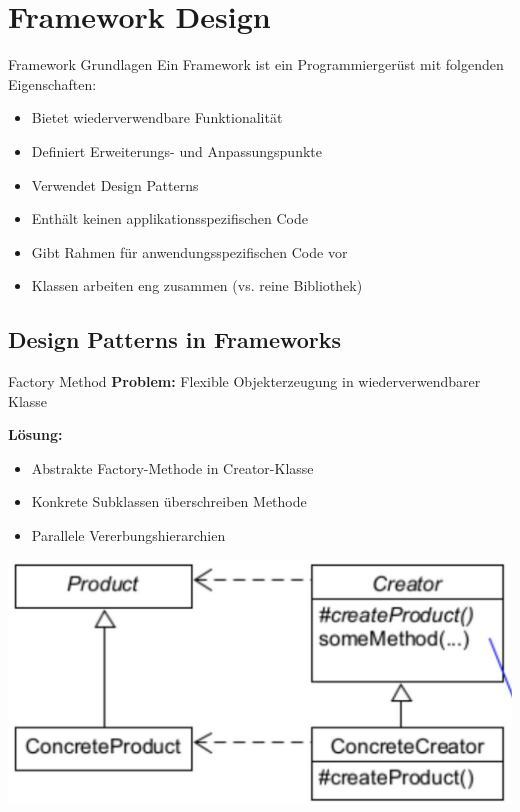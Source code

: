 \section{Framework Design}

\begin{concept}{Framework Grundlagen}
Ein Framework ist ein Programmiergerüst mit folgenden Eigenschaften:
\begin{itemize}
    \item Bietet wiederverwendbare Funktionalität
    \item Definiert Erweiterungs- und Anpassungspunkte
    \item Verwendet Design Patterns
    \item Enthält keinen applikationsspezifischen Code
    \item Gibt Rahmen für anwendungsspezifischen Code vor
    \item Klassen arbeiten eng zusammen (vs. reine Bibliothek)
\end{itemize}
\end{concept}

\subsection{Design Patterns in Frameworks}

\begin{definition}{Factory Method}
\textbf{Problem:} Flexible Objekterzeugung in wiederverwendbarer Klasse

\textbf{Lösung:}
\begin{itemize}
    \item Abstrakte Factory-Methode in Creator-Klasse
    \item Konkrete Subklassen überschreiben Methode
    \item Parallele Vererbungshierarchien
\end{itemize}

\includegraphics[width=0.6\linewidth]{images/2025_01_02_73d93f10fa91ab6123dcg-16}
\end{definition}

